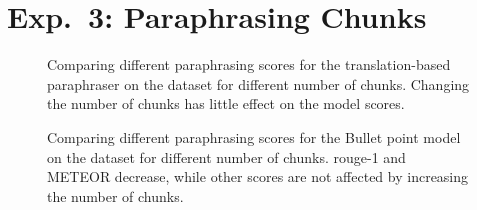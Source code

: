 \section{Exp.\ 3: Paraphrasing Chunks}
\label{sec:app_chunks}

\begin{figure}[H]
    \centering
    
    \caption[Paraphrasing scores for the translation-based paraphraser.]{Comparing different paraphrasing scores for the translation-based paraphraser on the \dataGutenberg{} dataset for different number of chunks. 
    Changing the number of chunks has little effect on the model scores.}
    \label{fig:abl_chunks_gutenberg_translation}
\end{figure}

\begin{figure}[H]
    \centering
    
    \caption[Paraphrasing scores for the Bullet point model.]{Comparing different paraphrasing scores for the Bullet point model on the \dataStudent{} dataset for different number of chunks. 
    \ac{rouge}-1 and METEOR decrease, while other scores are not affected by increasing the number of chunks.}
    \label{fig:abl_chunks_student_essays_task}
\end{figure}
